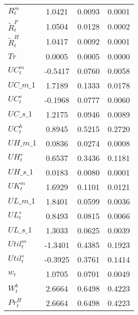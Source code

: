 \begin{center}
\begin{longtable}{lccc}
$  R^m_t                    $	 & 	       1.0421	 & 	       0.0093	 & 	       0.0001 \\ 
$  \tilde{R}^F_t            $	 & 	       1.0504	 & 	       0.0128	 & 	       0.0002 \\ 
$  \tilde{R}^H_t            $	 & 	       1.0417	 & 	       0.0092	 & 	       0.0001 \\ 
$ Tr                        $	 & 	       0.0005	 & 	       0.0005	 & 	       0.0000 \\ 
$ UC^m_t                    $	 & 	      -0.5417	 & 	       0.0760	 & 	       0.0058 \\ 
$UC\_m\_1                   $	 & 	       1.7189	 & 	       0.1333	 & 	       0.0178 \\ 
$ UC^s_t                    $	 & 	      -0.1968	 & 	       0.0777	 & 	       0.0060 \\ 
$UC\_s\_1                   $	 & 	       1.2175	 & 	       0.0946	 & 	       0.0089 \\ 
$ UC^h_t                    $	 & 	       0.8945	 & 	       0.5215	 & 	       0.2720 \\ 
$UH\_m\_1                   $	 & 	       0.0836	 & 	       0.0274	 & 	       0.0008 \\ 
$  UH^s_t                   $	 & 	       0.6537	 & 	       0.3436	 & 	       0.1181 \\ 
$UH\_s\_1                   $	 & 	       0.0183	 & 	       0.0080	 & 	       0.0001 \\ 
$  UK^m_t                   $	 & 	       1.6929	 & 	       0.1101	 & 	       0.0121 \\ 
$UL\_m\_1                   $	 & 	       1.8401	 & 	       0.0599	 & 	       0.0036 \\ 
$  UL^s_t                   $	 & 	       0.8493	 & 	       0.0815	 & 	       0.0066 \\ 
$UL\_s\_1                   $	 & 	       1.3033	 & 	       0.0625	 & 	       0.0039 \\ 
$ Util^m_t                  $	 & 	      -1.3401	 & 	       0.4385	 & 	       0.1923 \\ 
$  Util^s_t                 $	 & 	      -0.3925	 & 	       0.3761	 & 	       0.1414 \\ 
$ w_t                       $	 & 	       1.0705	 & 	       0.0701	 & 	       0.0049 \\ 
$ W^b_t                     $	 & 	       2.6664	 & 	       0.6498	 & 	       0.4223 \\ 
$ Pr^H_t                    $	 & 	       2.6664	 & 	       0.6498	 & 	       0.4223 \\ 

\end{longtable}
\end{center}
